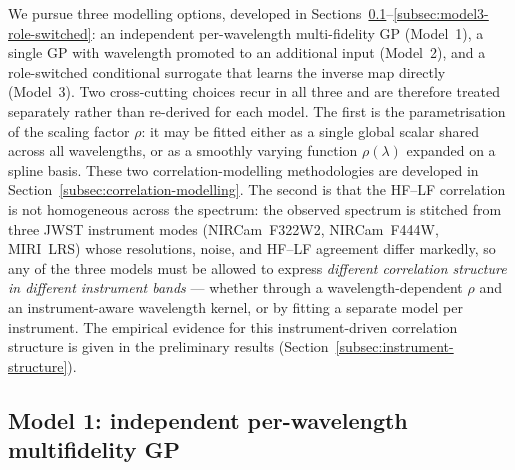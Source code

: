 \documentclass[11pt,a4paper]{article}
\begin{document}
We pursue three modelling options, developed in
Sections~\ref{subsec:model1}--\ref{subsec:model3-role-switched}: an independent
per-wavelength multi-fidelity GP (Model~1), a single GP with wavelength promoted
to an additional input (Model~2), and a role-switched conditional surrogate that
learns the inverse map directly (Model~3). Two cross-cutting choices recur in all
three and are therefore treated separately rather than re-derived for each model.
The first is the parametrisation of the scaling factor $\rho$: it may be fitted
either as a single global scalar shared across all wavelengths, or as a smoothly
varying function $\rho(\lambda)$ expanded on a spline basis. These two
correlation-modelling methodologies are developed in
Section~\ref{subsec:correlation-modelling}. The second is that the HF--LF
correlation is not homogeneous across the spectrum: the observed spectrum is
stitched from three JWST instrument modes (NIRCam~F322W2, NIRCam~F444W, MIRI~LRS)
whose resolutions, noise, and HF--LF agreement differ markedly, so any of the
three models must be allowed to express \emph{different correlation structure in
different instrument bands} --- whether through a wavelength-dependent $\rho$ and
an instrument-aware wavelength kernel, or by fitting a separate model per
instrument. The empirical evidence for this instrument-driven correlation
structure is given in the preliminary results
(Section~\ref{subsec:instrument-structure}).


\subsection{Model 1: independent per-wavelength multifidelity GP}
\label{subsec:model1}
\end{document}
